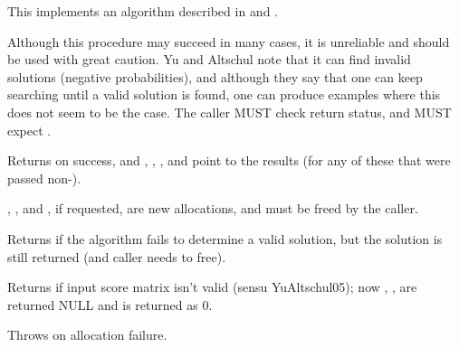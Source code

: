 \begin{sreapi}
This implements an algorithm described in
\citep{YuAltschul03} and \citep{YuAltschul05}.

Although this procedure may succeed in many cases,
it is unreliable and should be used with great caution.
Yu and Altschul note that it can find invalid solutions
(negative probabilities), and although they say that one
can keep searching until a valid solution is found, 
one can produce examples where this does not seem to be
the case. The caller MUST check return status, and
MUST expect .

Returns  on success, and , , , and 
point to the results (for any of these that were passed non-).

, , and , if requested, are new
allocations, and must be freed by the caller.

Returns  if the algorithm fails to determine a valid solution,
but the solution is still returned (and caller needs to free).

Returns  if input score matrix isn't valid (sensu YuAltschul05);
now , ,  are returned NULL and  is returned
as 0.

Throws  on allocation failure.



\end{sreapi}

